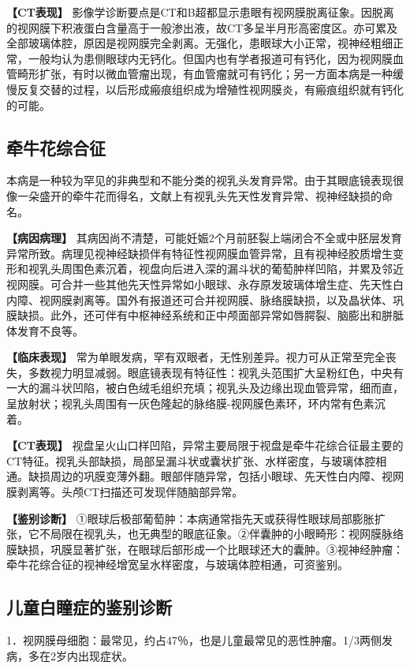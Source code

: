 \textbf{【CT表现】}
影像学诊断要点是CT和B超都显示患眼有视网膜脱离征象。因脱离的视网膜下积液蛋白含量高于一般渗出液，故CT多呈半月形高密度区。亦可累及全部玻璃体腔，原因是视网膜完全剥离。无强化，患眼球大小正常，视神经粗细正常，一般均认为患侧眼球内无钙化。但国内也有学者报道可有钙化，因为视网膜血管畸形扩张，有时以微血管瘤出现，有血管瘤就可有钙化；另一方面本病是一种缓慢反复交替的过程，以后形成瘢痕组织成为增殖性视网膜炎，有瘢痕组织就有钙化的可能。

\subsection{牵牛花综合征}

本病是一种较为罕见的非典型和不能分类的视乳头发育异常。由于其眼底镜表现很像一朵盛开的牵牛花而得名，文献上有视乳头先天性发育异常、视神经缺损的命名。

\textbf{【病因病理】}
其病因尚不清楚，可能妊娠2个月前胚裂上端闭合不全或中胚层发育异常所致。病理见视神经缺损伴有特征性视网膜血管异常，且有视神经胶质增生变形和视乳头周围色素沉着，视盘向后进入深的漏斗状的葡萄肿样凹陷，并累及邻近视网膜。可合并一些其他先天性异常如小眼球、永存原发玻璃体增生症、先天性白内障、视网膜剥离等。国外有报道还可合并视网膜、脉络膜缺损，以及晶状体、巩膜缺损。此外，还可伴有中枢神经系统和正中颅面部异常如唇腭裂、脑膨出和胼胝体发育不良等。

\textbf{【临床表现】}
常为单眼发病，罕有双眼者，无性别差异。视力可从正常至完全丧失，多数视力明显减弱。眼底镜表现有特征性：视乳头范围扩大呈粉红色，中央有一大的漏斗状凹陷，被白色绒毛组织充填；视乳头及边缘出现血管异常，细而直，呈放射状；视乳头周围有一灰色隆起的脉络膜-视网膜色素环，环内常有色素沉着。

\textbf{【CT表现】}
视盘呈火山口样凹陷，异常主要局限于视盘是牵牛花综合征最主要的CT特征。视乳头部缺损，局部呈漏斗状或囊状扩张、水样密度，与玻璃体腔相通。缺损周边的巩膜变薄外翻。眼部伴随异常，包括小眼球、先天性白内障、视网膜剥离等。头颅CT扫描还可发现伴随脑部异常。

\textbf{【鉴别诊断】}
①眼球后极部葡萄肿：本病通常指先天或获得性眼球局部膨胀扩张，它不局限在视乳头，也无典型的眼底征象。②伴囊肿的小眼畸形：视网膜脉络膜缺损，巩膜显著扩张，在眼球后部形成一个比眼球还大的囊肿。③视神经肿瘤：牵牛花综合征的视神经增宽呈水样密度，与玻璃体腔相通，可资鉴别。

\subsection{儿童白瞳症的鉴别诊断}

1．视网膜母细胞：最常见，约占47％，也是儿童最常见的恶性肿瘤。1/3两侧发病，多在2岁内出现症状。

